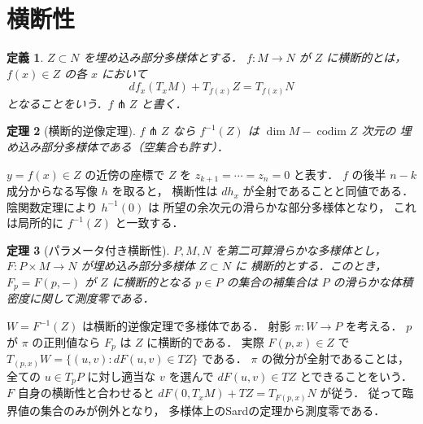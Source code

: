 \documentclass[a5paper,10pt,onecolumn]{jsarticle}
\makeatletter
\theoremstyle{mathnotetheorem}
\newtheorem{theorem}{定理}[section]
\newtheorem{definition}[theorem]{定義}
\renewcommand{\proofname}{証明}
\renewenvironment{proof}[1][\proofname]{%
  \par\pushQED{\qed}\normalfont\topsep4\p@\@plus2\p@\relax
  \trivlist\item[\hskip\labelsep\bfseries #1]\ignorespaces
}{\popQED\endtrivlist\@endpefalse}
\makeatother
\begin{document}
\section{横断性}
\begin{definition}
$Z\subset N$ を埋め込み部分多様体とする．
$f:M\to N$ が $Z$ に横断的とは，
$f(x)\in Z$ の各 $x$ において
\[
 df_x(T_xM)+T_{f(x)}Z=T_{f(x)}N
\]
となることをいう．$f\pitchfork Z$ と書く．
\end{definition}
\begin{theorem}[横断的逆像定理]\label{thm:transversepre}
$f\pitchfork Z$ なら
$f^{-1}(Z)$ は $\dim M-\operatorname{codim}Z$ 次元の
埋め込み部分多様体である（空集合も許す）．
\end{theorem}
\begin{proof}
$y=f(x)\in Z$ の近傍の座標で
$Z$ を $z_{k+1}=\cdots=z_n=0$ と表す．
$f$ の後半 $n-k$ 成分からなる写像 $h$ を取ると，
横断性は $dh_x$ が全射であることと同値である．
陰関数定理により $h^{-1}(0)$ は
所望の余次元の滑らかな部分多様体となり，
これは局所的に $f^{-1}(Z)$ と一致する．
\end{proof}
\begin{theorem}[パラメータ付き横断性]
$P,M,N$ を第二可算滑らかな多様体とし，
$F:P\times M\to N$ が埋め込み部分多様体 $Z\subset N$ に
横断的とする．このとき，$F_p=F(p,-)$ が
$Z$ に横断的となる $p\in P$ の集合の補集合は
$P$ の滑らかな体積密度に関して測度零である．
\end{theorem}
\begin{proof}
$W=F^{-1}(Z)$ は横断的逆像定理で多様体である．
射影 $\pi:W\to P$ を考える．
$p$ が $\pi$ の正則値なら
$F_p$ は $Z$ に横断的である．
実際 $F(p,x)\in Z$ で
$T_{(p,x)}W=\{(u,v):dF(u,v)\in TZ\}$ である．
$\pi$ の微分が全射であることは，
全ての $u\in T_pP$ に対し適当な $v$ を選んで
$dF(u,v)\in TZ$ とできることをいう．
$F$ 自身の横断性と合わせると
$dF(0,T_xM)+TZ=T_{F(p,x)}N$ が従う．
従って臨界値の集合のみが例外となり，
多様体上のSardの定理から測度零である．
\end{proof}
\end{document}
